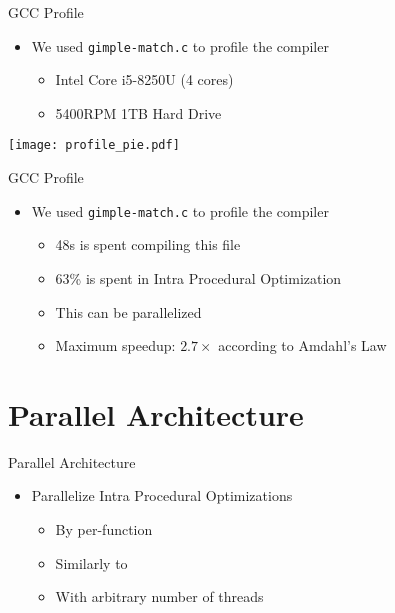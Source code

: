\begin{frame}{GCC Profile}
    \begin{itemize}
        \item We used \texttt{gimple-match.c} to profile the compiler
            \begin{itemize}
                \item Intel Core i5-8250U (4 cores)
                \item 5400RPM 1TB Hard Drive
            \end{itemize}
    \end{itemize}

            \centering
            \texttt{[image: profile\_pie.pdf]}
\end{frame}

\begin{frame}{GCC Profile}
    \begin{itemize}
        \item We used \texttt{gimple-match.c} to profile the compiler
            \begin{itemize}
                \item 48s is spent compiling this file
                \item 63\% is spent in Intra Procedural Optimization
                \item This can be parallelized
                \item Maximum speedup: $2.7\times$ according to Amdahl's Law
            \end{itemize}
    \end{itemize}

\end{frame}

\section{Parallel Architecture}

\begin{frame}{Parallel Architecture}
    \begin{itemize}
        \item Parallelize Intra Procedural Optimizations
            \begin{itemize}
                \item By per-function
                \item Similarly to \cite{wortman1992}
                \item With arbitrary number of threads
    \end{itemize}
\end{itemize}

\end{frame}

